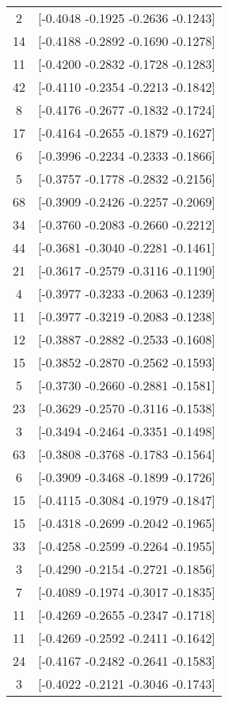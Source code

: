 \documentclass[12pt, fullpage,letterpaper]{article}
\begin{document}
\begin{enumerate}
\begin{enumerate}
{\begin{longtable}{|c|c|}
			  2 &  [-0.4048 -0.1925 -0.2636 -0.1243] \\
			 14 &  [-0.4188 -0.2892 -0.1690 -0.1278] \\
			 11 &  [-0.4200 -0.2832 -0.1728 -0.1283] \\
			 42 &  [-0.4110 -0.2354 -0.2213 -0.1842] \\
			  8 &  [-0.4176 -0.2677 -0.1832 -0.1724] \\
			 17 &  [-0.4164 -0.2655 -0.1879 -0.1627] \\
			  6 &  [-0.3996 -0.2234 -0.2333 -0.1866] \\
			  5 &  [-0.3757 -0.1778 -0.2832 -0.2156] \\
			 68 &  [-0.3909 -0.2426 -0.2257 -0.2069] \\
			 34 &  [-0.3760 -0.2083 -0.2660 -0.2212] \\
			 44 &  [-0.3681 -0.3040 -0.2281 -0.1461] \\
			 21 &  [-0.3617 -0.2579 -0.3116 -0.1190] \\
			  4 &  [-0.3977 -0.3233 -0.2063 -0.1239] \\
			 11 &  [-0.3977 -0.3219 -0.2083 -0.1238] \\
			 12 &  [-0.3887 -0.2882 -0.2533 -0.1608] \\
			 15 &  [-0.3852 -0.2870 -0.2562 -0.1593] \\
			  5 &  [-0.3730 -0.2660 -0.2881 -0.1581] \\
			 23 &  [-0.3629 -0.2570 -0.3116 -0.1538] \\
			  3 &  [-0.3494 -0.2464 -0.3351 -0.1498] \\
			 63 &  [-0.3808 -0.3768 -0.1783 -0.1564] \\
			  6 &  [-0.3909 -0.3468 -0.1899 -0.1726] \\
			 15 &  [-0.4115 -0.3084 -0.1979 -0.1847] \\
			 15 &  [-0.4318 -0.2699 -0.2042 -0.1965] \\
			 33 &  [-0.4258 -0.2599 -0.2264 -0.1955] \\
			  3 &  [-0.4290 -0.2154 -0.2721 -0.1856] \\
			  7 &  [-0.4089 -0.1974 -0.3017 -0.1835] \\
			 11 &  [-0.4269 -0.2655 -0.2347 -0.1718] \\
			 11 &  [-0.4269 -0.2592 -0.2411 -0.1642] \\
			 24 &  [-0.4167 -0.2482 -0.2641 -0.1583] \\
			  3 &  [-0.4022 -0.2121 -0.3046 -0.1743] \\

\end{longtable}}
\end{enumerate}
\end{enumerate}
\end{document}
